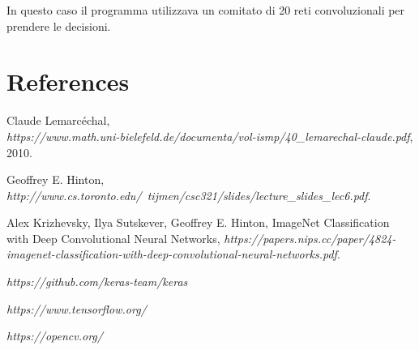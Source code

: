 \documentclass[12pt]{article}
\begin{document}
In questo caso il programma utilizzava un comitato di 20 reti convoluzionali
per prendere le decisioni.


\section{References}

\begin{thebibliography}{9}

  Claude Lemarcéchal,\\
  \textit{https://www.math.uni-bielefeld.de/documenta/vol-ismp/40\_lemarechal-claude.pdf},
  2010.

   Geoffrey E. Hinton,\\
  \textit{http://www.cs.toronto.edu/~tijmen/csc321/slides/lecture\_slides\_lec6.pdf}.

   Alex Krizhevsky, Ilya Sutskever, Geoffrey E. Hinton, 
   ImageNet Classification with Deep Convolutional Neural Networks,
  \textit{https://papers.nips.cc/paper/4824-imagenet-classification-with-deep-convolutional-neural-networks.pdf}.

   \textit{https://github.com/keras-team/keras}

   \textit{https://www.tensorflow.org/}

   \textit{https://opencv.org/}

\end{thebibliography}
\end{document}
